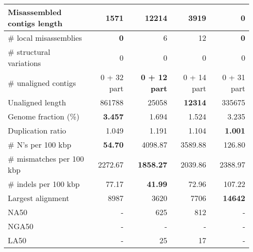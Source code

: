 \documentclass[12pt,a4paper]{article}
\begin{document}
\begin{table}[ht]
\begin{center}
\begin{tabular}{|l*{4}{|r}|}
Misassembled contigs length & 1571 & 12214 & 3919 & {\bf 0} \\ \hline
\# local misassemblies & {\bf 0} & 6 & 12 & {\bf 0} \\ \hline
\# structural variations & 0 & 0 & 0 & 0 \\ \hline
\# unaligned contigs & 0 + 32 part & {\bf 0 + 12 part} & 0 + 14 part & 0 + 31 part \\ \hline
Unaligned length & 861788 & 25058 & {\bf 12314} & 335675 \\ \hline
Genome fraction (\%) & {\bf 3.457} & 1.694 & 1.524 & 3.235 \\ \hline
Duplication ratio & 1.049 & 1.191 & 1.104 & {\bf 1.001} \\ \hline
\# N's per 100 kbp & {\bf 54.70} & 4098.87 & 3589.88 & 126.80 \\ \hline
\# mismatches per 100 kbp & 2272.67 & {\bf 1858.27} & 2039.86 & 2388.97 \\ \hline
\# indels per 100 kbp & 77.17 & {\bf 41.99} & 72.96 & 107.22 \\ \hline
Largest alignment & 8987 & 3620 & 7706 & {\bf 14642} \\ \hline
NA50 & - & 625 & 812 & - \\ \hline
NGA50 & - & - & - & - \\ \hline
LA50 & - & 25 & 17 & - \\ \hline
\end{tabular}
\end{center}
\end{table}
\end{document}

